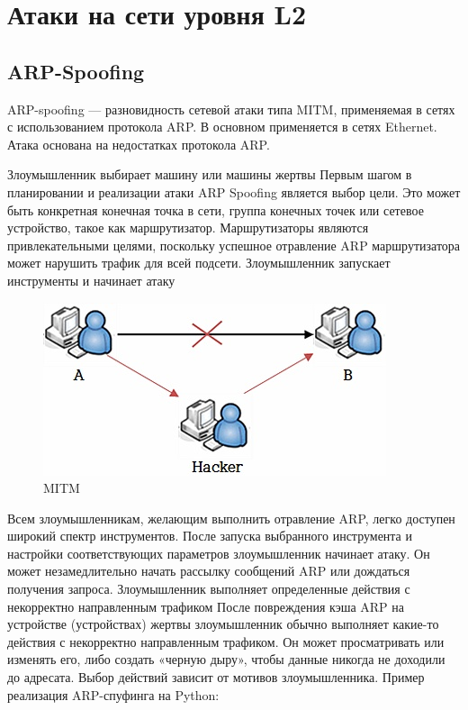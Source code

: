 \documentclass[a4paper, 12pt]{report}
\begin{document}
	\chapter{Атаки на сети уровня L2}
		\section{ARP-Spoofing}
		
		ARP-spoofing \cite{бирюков2022информационная} — разновидность сетевой атаки типа MITM, применяемая в сетях с использованием протокола ARP. В основном применяется в сетях Ethernet. Атака основана на недостатках протокола ARP.
		
		Злоумышленник выбирает машину или машины жертвы
		Первым шагом в планировании и реализации атаки ARP Spoofing является выбор цели. Это может быть конкретная конечная точка в сети, группа конечных точек или сетевое устройство, такое как маршрутизатор. Маршрутизаторы являются привлекательными целями, поскольку успешное отравление ARP маршрутизатора может нарушить трафик для всей подсети.
		Злоумышленник запускает инструменты и начинает атаку
		\begin{figure}[h!]
			\centering
			\includegraphics[scale=0.45]{img/2.jpg}
			\caption{MITM}
			\label{chargets}
		\end{figure}
		Всем злоумышленникам, желающим выполнить отравление ARP, легко доступен широкий спектр инструментов. После запуска выбранного инструмента и настройки соответствующих параметров злоумышленник начинает атаку. Он может незамедлительно начать рассылку сообщений ARP или дождаться получения запроса.
		Злоумышленник выполняет определенные действия с некорректно направленным трафиком
		После повреждения кэша ARP на устройстве (устройствах) жертвы злоумышленник обычно выполняет какие-то действия с некорректно направленным трафиком. Он может просматривать или изменять его, либо создать «черную дыру», чтобы данные никогда не доходили до адресата. Выбор действий зависит от мотивов злоумышленника. Пример реализация ARP-спуфинга на Python:
		
\end{document}
